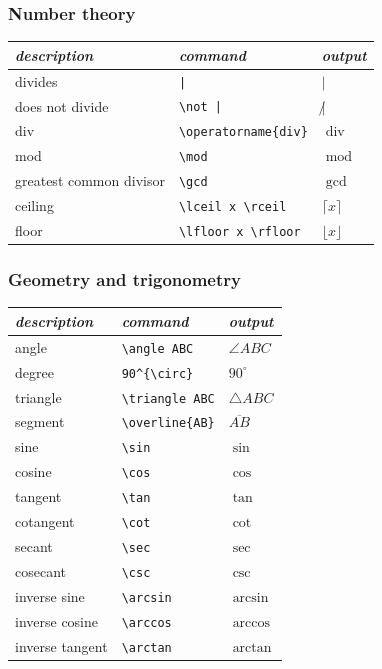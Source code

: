 \documentclass{article} %
\begin{document}
    \subsubsection{Number theory}
        \begin{center}
        \begin{tabular}{l|l|l}
        \emph{description} & \emph{command} & \emph{output}\\ \hline
        divides & \verb!|! & $|$\\
        does not divide & \verb!\not |! & $\not |$\\
        div & \verb!\operatorname{div}! & $\operatorname{div}$\\
        mod & \verb!\mod! & $\operatorname{mod}$\\
        greatest common divisor & \verb!\gcd! & $\gcd$\\
        ceiling & \verb!\lceil x \rceil! & $\lceil x\rceil$\\
        floor & \verb!\lfloor x \rfloor! & $\lfloor x \rfloor$\\
        \end{tabular}
        \end{center}


    \subsubsection{Geometry and trigonometry}
        \begin{center}
        \begin{tabular}{l|l|l}
        \emph{description} & \emph{command} & \emph{output}\\ \hline
        angle& \verb!\angle ABC! & $\angle ABC$\\
        degree& \verb!90^{\circ}! & $90^{\circ}$\\
        triangle& \verb!\triangle ABC! & $\triangle ABC$\\
        segment& \verb!\overline{AB}! & $\overline{AB}$\\
        sine& \verb!\sin! & $\sin$\\
        cosine& \verb!\cos! & $\cos$\\
        tangent& \verb!\tan! & $\tan$\\
        cotangent& \verb!\cot! & $\cot$\\
        secant& \verb!\sec! & $\sec$\\
        cosecant& \verb!\csc! & $\csc$\\
        inverse sine& \verb!\arcsin! & $\arcsin$\\
        inverse cosine& \verb!\arccos! & $\arccos$\\
        inverse tangent& \verb!\arctan! & $\arctan$\\
        \end{tabular}
        \end{center}
\end{document}
